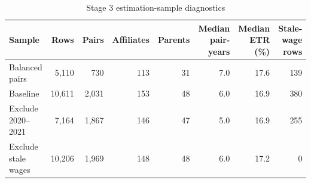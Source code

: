 \begin{table}[H]
\centering
\footnotesize
\setlength{\tabcolsep}{3pt}
\caption{Stage 3 estimation-sample diagnostics}
\label{tab:app_stage3_sample_summary}
\begin{tabular}{@{}lrrrrrrr@{}}
\toprule
Sample & Rows & Pairs & Affiliates & Parents & Median pair-years & Median ETR (\%) & Stale-wage rows \\
\midrule
Balanced pairs &  5,110 &   730 & 113 & 31 & 7.0 & 17.6 & 139 \\
Baseline & 10,611 & 2,031 & 153 & 48 & 6.0 & 16.9 & 380 \\
Exclude 2020–2021 &  7,164 & 1,867 & 146 & 47 & 5.0 & 16.9 & 255 \\
Exclude stale wages & 10,206 & 1,969 & 148 & 48 & 6.0 & 17.2 &   0 \\
\bottomrule
\end{tabular}
\end{table}
